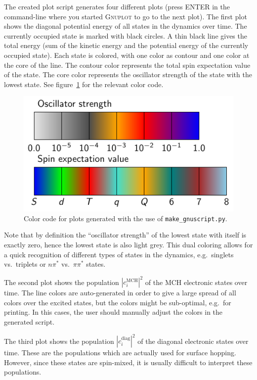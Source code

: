 \documentclass[a4paper,11pt,DIV=15,openany,twoside=false]{scrbook}
\newcommand{\ttt}[1]{\texttt{#1}}
\begin{document}
The created plot script generates four different plots (press ENTER in the command-line where you started \textsc{Gnuplot} to go to the next plot). The first plot shows the diagonal potential energy of all states in the dynamics over time. The currently occupied state is marked with black circles. A thin black line gives the total energy (sum of the kinetic energy and the potential energy of the currently occupied state). Each state is colored, with one color as contour and one color at the core of the line. The contour color represents the total spin expectation value of the state. The core color represents the oscillator strength of the state with the lowest state. See figure~\ref{fig:colors} for the relevant color code.
\begin{figure}
  \centering
  \includegraphics[scale=1]{img/colors/colors.pdf}
  \caption{Color code for plots generated with the use of \ttt{make\_gnuscript.py}.}
  \label{fig:colors}
\end{figure}
Note that by definition the ``oscillator strength'' of the lowest state with itself is exactly zero, hence the lowest state is also light grey. This dual coloring allows for a quick recognition of different types of states in the dynamics, e.g.\ singlets vs.\ triplets or $n\pi^*$ vs.\ $\pi\pi^*$ states.

The second plot shows the population $|c_i^{\text{MCH}}|^2$ of the MCH electronic states over time. The line colors are auto-generated in order to give a large spread of all colors over the excited states, but the colors might be sub-optimal, e.g.\ for printing. In this cases, the user should manually adjust the colors in the generated script.

The third plot shows the population $|c_i^{\text{diag}}|^2$ of the diagonal electronic states over time. These are the populations which are actually used for surface hopping. However, since these states are spin-mixed, it is usually difficult to interpret these populations.
\end{document}
